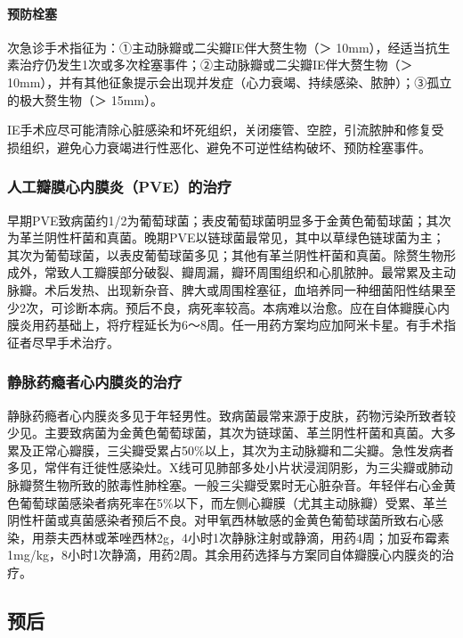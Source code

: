 \paragraph{预防栓塞}

次急诊手术指征为：①主动脉瓣或二尖瓣IE伴大赘生物（＞
10mm），经适当抗生素治疗仍发生1次或多次栓塞事件；②主动脉瓣或二尖瓣IE伴大赘生物（＞
10mm），并有其他征象提示会出现并发症（心力衰竭、持续感染、脓肿）；③孤立的极大赘生物（＞
15mm）。

IE手术应尽可能清除心脏感染和坏死组织，关闭瘘管、空腔，引流脓肿和修复受损组织，避免心力衰竭进行性恶化、避免不可逆性结构破坏、预防栓塞事件。

\subsubsection{人工瓣膜心内膜炎（PVE）的治疗}

早期PVE致病菌约1/2为葡萄球菌；表皮葡萄球菌明显多于金黄色葡萄球菌；其次为革兰阴性杆菌和真菌。晚期PVE以链球菌最常见，其中以草绿色链球菌为主；其次为葡萄球菌，以表皮葡萄球菌多见；其他有革兰阴性杆菌和真菌。除赘生物形成外，常致人工瓣膜部分破裂、瓣周漏，瓣环周围组织和心肌脓肿。最常累及主动脉瓣。术后发热、出现新杂音、脾大或周围栓塞征，血培养同一种细菌阳性结果至少2次，可诊断本病。预后不良，病死率较高。本病难以治愈。应在自体瓣膜心内膜炎用药基础上，将疗程延长为6～8周。任一用药方案均应加阿米卡星。有手术指征者尽早手术治疗。

\subsubsection{静脉药瘾者心内膜炎的治疗}

静脉药瘾者心内膜炎多见于年轻男性。致病菌最常来源于皮肤，药物污染所致者较少见。主要致病菌为金黄色葡萄球菌，其次为链球菌、革兰阴性杆菌和真菌。大多累及正常心瓣膜，三尖瓣受累占50\%以上，其次为主动脉瓣和二尖瓣。急性发病者多见，常伴有迁徙性感染灶。X线可见肺部多处小片状浸润阴影，为三尖瓣或肺动脉瓣赘生物所致的脓毒性肺栓塞。一般三尖瓣受累时无心脏杂音。年轻伴右心金黄色葡萄球菌感染者病死率在5\%以下，而左侧心瓣膜（尤其主动脉瓣）受累、革兰阴性杆菌或真菌感染者预后不良。对甲氧西林敏感的金黄色葡萄球菌所致右心感染，用萘夫西林或苯唑西林2g，4小时1次静脉注射或静滴，用药4周；加妥布霉素1mg/kg，8小时1次静滴，用药2周。其余用药选择与方案同自体瓣膜心内膜炎的治疗。

\subsection{预后}

